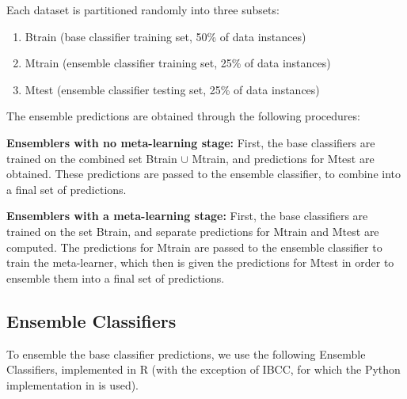 \documentclass{document}
\begin{document}
Each dataset is partitioned randomly into three subsets:
\begin{enumerate}
\item Btrain (base classifier training set, 50\% of data instances)
\item Mtrain (ensemble classifier training set, 25\% of data instances)
\item Mtest (ensemble classifier testing set, 25\% of data instances)
\end{enumerate}

\noindent
The ensemble predictions are obtained through the following procedures:

\vspace{1cm}
\noindent
\textbf{Ensemblers with no meta-learning stage:}
First, the base classifiers are trained on the combined set Btrain $\cup$ Mtrain, and predictions for Mtest are obtained. These predictions are passed to the ensemble classifier, to combine into a final set of predictions.

\noindent
\textbf{Ensemblers with a meta-learning stage:}
First, the base classifiers are trained on the set Btrain, and separate predictions for Mtrain and Mtest are computed. The predictions for Mtrain are passed to the ensemble classifier to train the meta-learner, which then is given the predictions for Mtest in order to ensemble them into a final set of predictions.


\subsection{Ensemble Classifiers}

To ensemble the base classifier predictions, we use the following Ensemble Classifiers, implemented in R (with the exception of IBCC, for which the Python implementation in \cite{Simpson13} is used).
\end{document}
